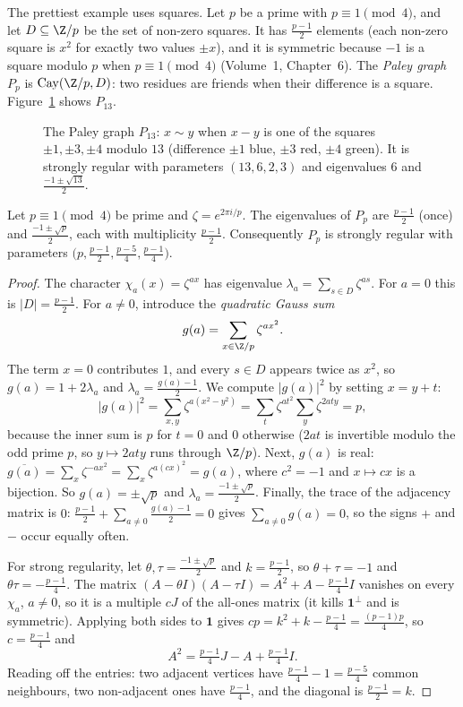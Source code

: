 The prettiest example uses squares. Let $p$ be a prime with $p\equiv1\pmod4$, and let $D\subseteq\Z/p$ be the set of non-zero
squares. It has $\frac{p-1}2$ elements (each non-zero square is $x^2$ for exactly two values $\pm x$), and it is symmetric because
$-1$ is a square modulo $p$ when $p\equiv1\pmod4$ (Volume~1, Chapter~6). The \emph{Paley graph} $P_p$ is $\operatorname{Cay}(\Z/p,D)$:
two residues are friends when their difference is a square. Figure~\ref{linear:fig:paley} shows $P_{13}$.

\begin{figure}[ht]
\centering
{}
\caption{The Paley graph $P_{13}$: $x\sim y$ when $x-y$ is one of the squares $\pm1,\pm3,\pm4$ modulo $13$ (difference $\pm1$ blue,
$\pm3$ red, $\pm4$ green). It is strongly regular with parameters $(13,6,2,3)$ and eigenvalues $6$ and $\frac{-1\pm\sqrt{13}}2$.}
\label{linear:fig:paley}
\end{figure}

\begin{theorem}\label{linear:thm:paley}
Let $p\equiv1\pmod4$ be prime and $\zeta=e^{2\pi i/p}$. The eigenvalues of $P_p$ are $\frac{p-1}2$ (once) and $\frac{-1\pm\sqrt p}2$,
each with multiplicity $\frac{p-1}2$. Consequently $P_p$ is strongly regular with parameters $\bigl(p,\frac{p-1}2,\frac{p-5}4,
\frac{p-1}4\bigr)$.
\end{theorem}
\begin{proof}
The character $\chi_a(x)=\zeta^{ax}$ has eigenvalue $\lambda_a=\sum_{s\in D}\zeta^{as}$. For $a=0$ this is $|D|=\frac{p-1}2$. For
$a\ne0$, introduce the \emph{quadratic Gauss sum}
\[
g(a)=\sum_{x\in\Z/p}\zeta^{ax^2}.
\]
The term $x=0$ contributes $1$, and every $s\in D$ appears twice as $x^2$, so $g(a)=1+2\lambda_a$ and $\lambda_a=\frac{g(a)-1}2$.
We compute $|g(a)|^2$ by setting $x=y+t$:
\[
|g(a)|^2=\sum_{x,y}\zeta^{a(x^2-y^2)}=\sum_t\zeta^{at^2}\sum_y\zeta^{2aty}=p,
\]
because the inner sum is $p$ for $t=0$ and $0$ otherwise ($2at$ is invertible modulo the odd prime $p$, so $y\mapsto2aty$ runs
through $\Z/p$). Next, $g(a)$ is real: $\overline{g(a)}=\sum_x\zeta^{-ax^2}=\sum_x\zeta^{a(cx)^2}=g(a)$, where $c^2=-1$ and
$x\mapsto cx$ is a bijection. So $g(a)=\pm\sqrt p$ and $\lambda_a=\frac{-1\pm\sqrt p}2$. Finally, the trace of the adjacency matrix
is $0$: $\frac{p-1}2+\sum_{a\ne0}\frac{g(a)-1}2=0$ gives $\sum_{a\ne0}g(a)=0$, so the signs $+$ and $-$ occur equally often.

For strong regularity, let $\theta,\tau=\frac{-1\pm\sqrt p}2$ and $k=\frac{p-1}2$, so $\theta+\tau=-1$ and $\theta\tau=-\frac{p-1}4$.
The matrix $(A-\theta I)(A-\tau I)=A^2+A-\frac{p-1}4I$ vanishes on every $\chi_a$, $a\ne0$, so it is a multiple $cJ$ of the
all-ones matrix (it kills $\mathbf 1^\perp$ and is symmetric). Applying both sides to $\mathbf 1$ gives $cp=k^2+k-\frac{p-1}4=
\frac{(p-1)p}4$, so $c=\frac{p-1}4$ and
\[
A^2=\tfrac{p-1}4J-A+\tfrac{p-1}4I.
\]
Reading off the entries: two adjacent vertices have $\frac{p-1}4-1=\frac{p-5}4$ common neighbours, two non-adjacent ones have
$\frac{p-1}4$, and the diagonal is $\frac{p-1}2=k$.
\end{proof}

